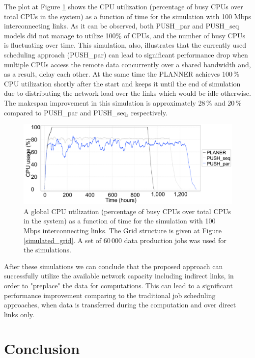 \documentclass{svjour3}                     %
\begin{document}
The plot at Figure \ref{multi_cpu_consumption} shows the CPU utilization (percentage of busy CPUs over total CPUs in the system) as a function of time for the simulation with 100 Mbps interconnecting links. As it can be observed, both PUSH\_par and PUSH\_seq models did not manage to utilize 100\% of CPUs, and the number of busy CPUs is fluctuating over time. This simulation, also, illustrates that the currently used scheduling approach (PUSH\_par) can lead to significant performance drop when multiple CPUs access the remote data concurrently over a shared bandwidth and, as a result, delay each other. At the same time the PLANNER achieves 100\,\% CPU utilization shortly after the start and keeps it until the end of simulation due to distributing the network load over the links which would be idle otherwise. The makespan improvement in this simulation is approximately 28\,\% and 20\,\% compared to PUSH\_par and PUSH\_seq, respectively.
\begin{figure}
  \begin{center}
    \includegraphics [trim= 0mm 00mm 0mm 00mm , clip,width=1\textwidth]{pic/3models_link01.png}
    \caption{A global CPU utilization (percentage of busy CPUs over total CPUs in the system) as a function of time for the simulation with 100 Mbps interconnecting links. The Grid structure is given at Figure \ref{simulated_grid}. A set of 60\,000 data production jobs was used for the simulations.}
      \label{multi_cpu_consumption}	
  \end{center}  
\end{figure}

After these simulations we can conclude that the proposed approach can successfully utilize the available network capacity including indirect links, in order to "preplace" the data for computations. This can lead to a significant performance improvement comparing to the traditional job scheduling approaches, when data is transferred during the computation and over direct links only. 

\section{Conclusion}
\label{Conclusion}
\end{document}
